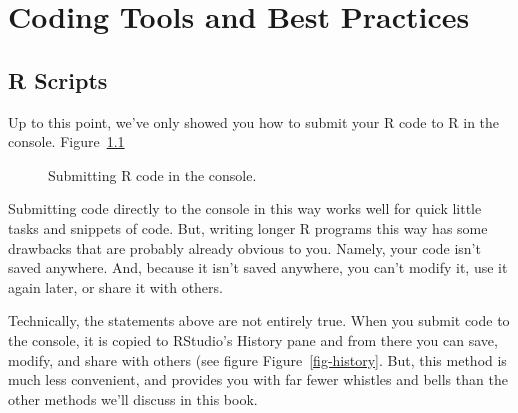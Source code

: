 \documentclass[
  letterpaper,
  DIV=11,
  numbers=noendperiod]{scrreprt}
\begin{document}
\part{Coding Tools and Best Practices}

\chapter{R Scripts}\label{r-scripts}

Up to this point, we've only showed you how to submit your R code to R
in the console. Figure~\ref{fig-using-console}

\begin{figure}


\caption{\label{fig-using-console}Submitting R code in the console.}

\end{figure}%

Submitting code directly to the console in this way works well for quick
little tasks and snippets of code. But, writing longer R programs this
way has some drawbacks that are probably already obvious to you. Namely,
your code isn't saved anywhere. And, because it isn't saved anywhere,
you can't modify it, use it again later, or share it with others.

Technically, the statements above are not entirely true. When you submit
code to the console, it is copied to RStudio's History pane and from
there you can save, modify, and share with others (see figure
Figure~\ref{fig-history}. But, this method is much less convenient, and
provides you with far fewer whistles and bells than the other methods
we'll discuss in this book.
\end{document}

